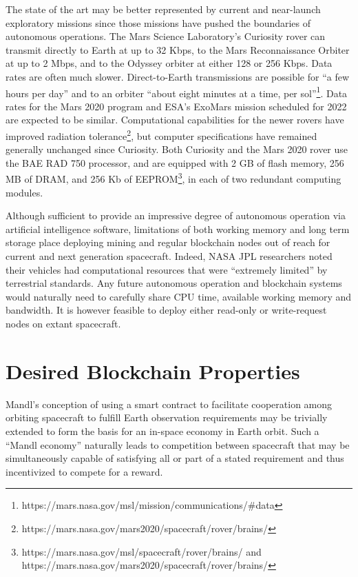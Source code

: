 \documentclass[journal ]{new-aiaa}
\begin{document}
The state of the art may be better represented by current and near-launch exploratory missions since those missions have pushed the boundaries of autonomous operations. The Mars Science Laboratory's Curiosity rover can transmit directly to Earth at up to 32 Kbps, to the Mars Reconnaissance Orbiter at up to 2 Mbps, and to the Odyssey orbiter at either 128 or 256 Kbps. Data rates are often much slower. Direct-to-Earth transmissions are possible for ``a few hours per day'' and to an orbiter ``about eight minutes at a time, per sol''\footnote{https://mars.nasa.gov/msl/mission/communications/\#data}. Data rates for the Mars 2020 program and ESA's ExoMars mission scheduled for 2022 are expected to be similar. Computational capabilities for the newer rovers have improved radiation tolerance\footnote{https://mars.nasa.gov/mars2020/spacecraft/rover/brains/}, but computer specifications have remained generally unchanged since Curiosity. Both Curiosity and the Mars 2020 rover use the BAE RAD 750 processor, and are equipped with 2 GB of flash memory, 256 MB of DRAM, and 256 Kb of EEPROM\footnote{https://mars.nasa.gov/msl/spacecraft/rover/brains/ and https://mars.nasa.gov/mars2020/spacecraft/rover/brains/}, in each of two redundant computing modules.

Although sufficient to provide an impressive degree of autonomous operation via artificial intelligence software\cite{bajracharya2008autonomy}, limitations of both working memory and long term storage place deploying mining and regular blockchain nodes out of reach for current and next generation spacecraft. Indeed, NASA JPL researchers noted their vehicles had computational resources that were ``extremely limited'' by terrestrial standards\cite{bajracharya2008autonomy}. Any future autonomous operation and blockchain systems would naturally need to carefully share CPU time, available working memory and bandwidth.
It is however feasible to deploy either read-only or write-request nodes on extant spacecraft.

\section{Desired Blockchain Properties}\label{sec:desiredproperties}

Mandl's conception of using a smart contract to facilitate cooperation among orbiting spacecraft to fulfill Earth observation requirements may be trivially extended to form the basis for an in-space economy in Earth orbit. Such a ``Mandl economy'' naturally leads to competition between spacecraft that may be simultaneously capable of satisfying all or part of a stated requirement and thus incentivized to compete for a reward.
\end{document}
